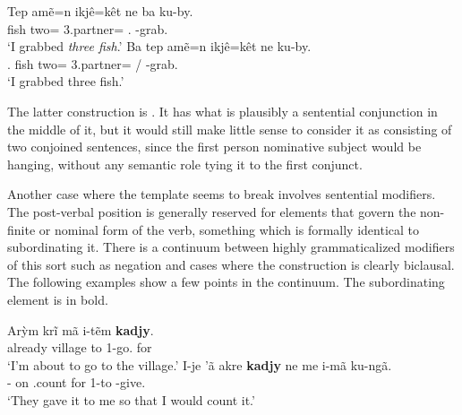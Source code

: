 \documentclass[output=paper]{langscibook}
\begin{document}

\ea
    \ea\label{foc-num}\gll Tep amẽ=n ikjê=kêt ne ba ku-by.\\
        fish two=\Ss{} 3.partner=\Neg{} \Nfut{} \First.\Nom{} \Third\Acc-grab.\Fin{}\\
      \glt `I grabbed {\em three fish}.'
    \ex\label{num-nofoc}\gll Ba tep amẽ=n ikjê=kêt ne ku-by.\\
        \First.\Nom{} fish two=\Ss{} 3.partner=\Neg{} \Ss{}/\Nfut{} \Third\Acc-grab.\Fin{}\\
      \glt `I grabbed three fish.'
    \z
\z

The latter construction is . It has what is plausibly a sentential conjunction in the middle of it, but it would still make little sense to consider it as consisting of two conjoined sentences, since the first person nominative subject would be hanging, without any semantic role tying it to the first conjunct.


Another case where the template seems to break involves sentential modifiers. The post-verbal position is generally reserved for elements that govern the non-finite or nominal form of the verb, something which is formally identical to subordinating it. There is a continuum between highly grammaticalized modifiers of this sort such as negation and cases where the construction is clearly biclausal. The following examples show a few points in the continuum. The subordinating element is in bold.

\ea\label{kadjy}
    \ea\gll Arỳm krĩ mã i-tẽm {\bfseries kadjy}.\\
        already village to 1-go.\Nfin{} for\\
      \glt `I'm about to go to the village.'
    \ex\gll I-je 'ã akre {\bfseries kadjy} ne me i-mã ku-ngã.\\
        \First-\Erg{} on \Third.count for \Nfut{} \Pl{} 1-to \Third\Acc{}-give.\Fin{}\\
      \glt `They gave it to me so that I would count it.'
    \z
\end{document}

